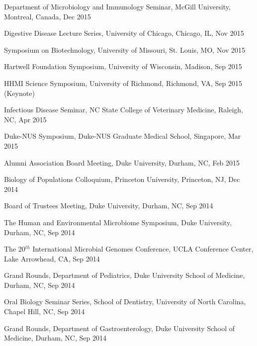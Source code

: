 \documentclass[overlapped,line,11pt]{res}
\begin{document}
\begin{resume}
\begin{revnumerate}[44]
\item {Department of Microbiology and Immunology Seminar, McGill University, Montreal, Canada, Dec 2015}

\item {Digestive Disease Lecture Series, University of Chicago, Chicago, IL, Nov 2015}

\item {Symposium on Biotechnology, University of Missouri, St. Louis, MO, Nov 2015}

\item {Hartwell Foundation Symposium, University of Wisconsin, Madison, Sep 2015}

\item {HHMI Science Symposium, University of Richmond, Richmond, VA, Sep 2015 (Keynote)}

\item {Infectious Disease Seminar, NC State College of Veterinary Medicine, Raleigh, NC, Apr 2015}

\item {Duke-NUS Symposium, Duke-NUS Graduate Medical School, Singapore, Mar 2015}

\item {Alumni Association Board Meeting, Duke University,
  Durham, NC, Feb 2015
  }

\item {Biology of Populations Colloquium, Princeton University, Princeton, NJ, Dec 2014
  }

\item {Board of Trustees Meeting, Duke University,
  Durham, NC, Sep 2014
  }

\item { The Human and Environmental Microbiome Symposium, Duke University,
  Durham, NC, Sep 2014
  }

\item {The 20$^{th}$ International Microbial Genomes Conference, UCLA
  Conference Center, Lake Arrowhead, CA, Sep 2014
  }

\item {Grand Rounds, Department of Pediatrics, Duke University School of
  Medicine, Durham, NC, Sep 2014
  }

\item {Oral Biology Seminar Series, School of Dentistry, University of
  North Carolina, Chapel Hill, NC, Sep 2014
  }

\item {Grand Rounds, Department of Gastroenterology, Duke University School of
  Medicine, Durham, NC, Sep 2014
  }


\end{revnumerate}
\end{resume}
\end{document}
